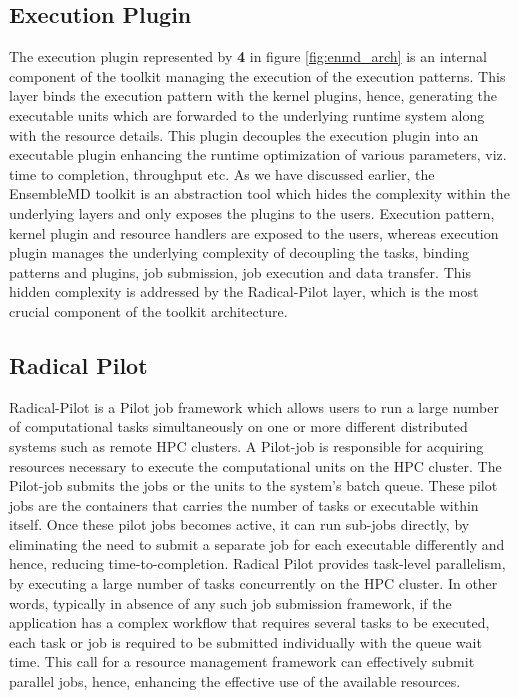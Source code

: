 \documentclass[10pt]{ruthesis}
\begin{document}
\subsection{Execution Plugin}
The execution plugin represented by \textbf{{4}} in figure \ref{fig:enmd_arch} is an internal component of the toolkit managing the execution of the execution patterns. This layer binds the execution pattern with the kernel plugins, hence, generating the executable units which are forwarded to the underlying runtime system along with the resource details. This plugin decouples the execution plugin into an executable plugin enhancing the runtime optimization of various parameters, viz. time to completion, throughput etc. 
As we have discussed earlier, the EnsembleMD toolkit is an abstraction tool which hides the complexity within the underlying layers and only exposes the plugins to the users. Execution pattern, kernel plugin and resource handlers are exposed to the users, whereas execution plugin manages the underlying complexity of decoupling the tasks, binding patterns and plugins, job submission, job execution and data transfer. This hidden complexity is addressed by the Radical-Pilot layer, which is the most crucial component of the toolkit architecture. 

\subsection{Radical Pilot}
Radical-Pilot is a Pilot job framework which allows users to run a large number of computational tasks simultaneously on one or more different distributed systems such as remote HPC clusters. A Pilot-job is responsible for acquiring resources necessary to execute the computational units on the HPC cluster. The Pilot-job submits the jobs or the units to the system's batch queue. These pilot jobs are the containers that carries the number of tasks or executable within itself. Once these pilot jobs becomes active, it can run sub-jobs directly, by eliminating the need to submit a separate job for each executable differently and hence, reducing time-to-completion. Radical Pilot provides task-level parallelism, by executing a large number of tasks concurrently on the HPC cluster. In other words, typically in absence of any such job submission framework, if the application has a complex workflow that requires several tasks to be executed, each task or job is required to be submitted individually with the queue wait time. This call for a resource management framework can effectively submit parallel jobs, hence, enhancing the effective use of the available resources.
\end{document}
